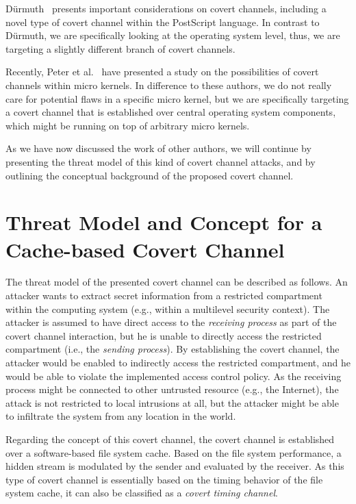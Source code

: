 \documentclass[runningheads,a4paper]{llncs}
\begin{document}
D{\"u}rmuth~\cite{duermuth09} presents important considerations on covert channels, including a novel type of covert channel within the PostScript language.
In contrast to D{\"u}rmuth, we are specifically looking at the operating system level, thus, we are targeting a slightly different branch of covert channels.

Recently, Peter et al.~\cite{cryptoeprint:2014:984} have presented a study on the possibilities of covert channels within micro kernels.
In difference to these authors, we do not really care for potential flaws in a specific micro kernel, but we are specifically targeting a covert channel that is established over central operating system components, which might be running on top of arbitrary micro kernels.

As we have now discussed the work of other authors, we will continue by presenting the threat model of this kind of covert channel attacks, and by outlining the conceptual background of the proposed covert channel.

\section{Threat Model and Concept for a Cache-based Covert Channel}\label{sec3}

The threat model of the presented covert channel can be described as follows.
An attacker wants to extract secret information from a restricted compartment within the computing system (e.g., within a multilevel security context).
The attacker is assumed to have direct access to the \emph{receiving process} as part of the covert channel interaction, but he is unable to directly access the restricted compartment (i.e., the \emph{sending process}).
By establishing the covert channel, the attacker would be enabled to indirectly access the restricted compartment, and he would be able to violate the implemented access control policy.
As the receiving process might be connected to other untrusted resource (e.g., the Internet), the attack is not restricted to local intrusions at all, but the attacker might be able to infiltrate the system from any location in the world.

Regarding the concept of this covert channel, the covert channel is established over a software-based file system cache.
Based on the file system performance, a hidden stream is modulated by the sender and evaluated by the receiver.
As this type of covert channel is essentially based on the timing behavior of the file system cache, it can also be classified as a \emph{covert timing channel}.
\end{document}
